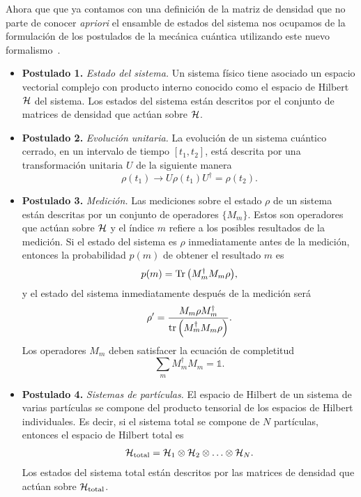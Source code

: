 Ahora que que ya contamos con una definición de la matriz de densidad 
que no parte de conocer \textit{apriori} el ensamble de estados del sistema
nos ocupamos de la formulación de los postulados de la mecánica cuántica 
utilizando este nuevo formalismo~\cite[p.~102]{nielsen_chuang_2011}.
\begin{itemize}
	\item[] \textbf{Postulado 1.} \textit{Estado del sistema.} 
	Un sistema físico tiene asociado un espacio vectorial complejo
	con producto interno conocido como el espacio de Hilbert $\mathcal{H}$ del
	sistema. Los estados del sistema están descritos por el conjunto 
	de matrices de densidad que actúan sobre $\mathcal{H}$.
	\item[] \textbf{Postulado 2.} \textit{Evolución unitaria.}
	La evolución de un sistema cuántico cerrado, en un intervalo 
	de tiempo $[t_1,t_2]$, está descrita	por una transformación unitaria $U$
	de la siguiente manera 
	\begin{equation} \label{eq:postulate-ClosedEvolution}
	\rho(t_1)\longrightarrow U\rho(t_1) U^{\dagger}=\rho(t_2).
	\end{equation}
	\item[] \textbf{Postulado 3.} \textit{Medición.}
	Las mediciones sobre el estado $\rho$ de un sistema 
	están descritas por un conjunto de operadores $\{M_m\}$. 
	Estos son operadores que actúan sobre $\mathcal{H}$ y el 
	índice $m$ refiere a los posibles
	resultados de la medición. Si el estado del sistema es $\rho$ 
	inmediatamente antes de la medición, entonces la probabilidad
	$p(m)$ de obtener el resultado $m$ es
	\begin{equation} \label{eq:post_MeasureProb}
	p(m)=\Tr \qty(M_m^{\dagger}M_m\rho),
	\end{equation}						
	y el estado del sistema inmediatamente después de la medición será
	\begin{equation} \label{eq:post_MeasureTrasnfState}
	\rho'=\frac{M_m\rho M_m^{\dagger}}{\tr \qty(M_m^{\dagger}M_m\rho)}.
	\end{equation}	
	Los operadores $M_m$ deben satisfacer la ecuación de completitud
	\begin{equation} \label{eq:post_MeasureMCompleteness}
	\sum _m M_m^{\dagger}M_m=\mathbb{1}.
	\end{equation}
	\item[] \textbf{Postulado 4.} \textit{Sistemas de partículas.}
	El espacio de Hilbert de un sistema 	de varias partículas se compone del
	producto tensorial de los espacios de Hilbert 	individuales.
	Es decir, si el sistema total se compone de $N$ partículas, 
	entonces el espacio de Hilbert total es
	\begin{align}
		\mathcal{H}_{\text{total}} = \mathcal{H}_1\otimes \mathcal{H}_2 \otimes \ldots \otimes \mathcal{H}_N.
	\end{align}
	Los estados del sistema total están descritos por las matrices de 
	densidad que actúan sobre $\mathcal{H} _{\text{total}}$.
\end{itemize}

